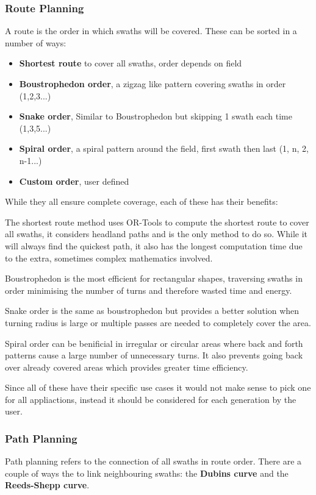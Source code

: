 \documentclass[final]{cmpreport_02}
\begin{document}
\subsubsection{Route Planning}
A route is the order in which swaths will be covered.
These can be sorted in a number of ways:

\begin{itemize}
	\item{\textbf{Shortest route} to cover all swaths, order depends on field}
	\item{\textbf{Boustrophedon order}, a zigzag like pattern covering swaths in order (1,2,3...)}
	\item{\textbf{Snake order}, Similar to Boustrophedon but skipping 1 swath each time (1,3,5...)}
	\item{\textbf{Spiral order}, a spiral pattern around the field, first swath then last (1, n, 2, n-1...)}
	\item{\textbf{Custom order}, user defined}
\end{itemize}
While they all ensure complete coverage, each of these has their benefits:

The shortest route method uses OR-Tools \citep{ortools} to compute the shortest route to cover all swaths, it considers headland paths and is the only method to do so.
While it will always find the quickest path, it also has the longest computation time due to the extra, sometimes complex mathematics involved.

Boustrophedon is the most efficient for rectangular shapes, traversing swaths in order minimising the number of turns and therefore wasted time and energy.

Snake order is the same as boustrophedon but provides a better solution when turning radius is large or multiple passes are needed to completely cover the area.


Spiral order can be benificial in irregular or circular areas where back and forth patterns cause a large number of unnecessary turns.
It also prevents going back over already covered areas which provides greater time efficiency.

Since all of these have their specific use cases it would not make sense to pick one for all appliactions, instead it should be considered for each generation by the user.

\subsubsection{Path Planning}
Path planning refers to the connection of all swaths in route order.
There are a couple of ways the to link neighbouring swaths: the \textbf{Dubins curve} and the \textbf{Reeds-Shepp curve}.
\end{document}
